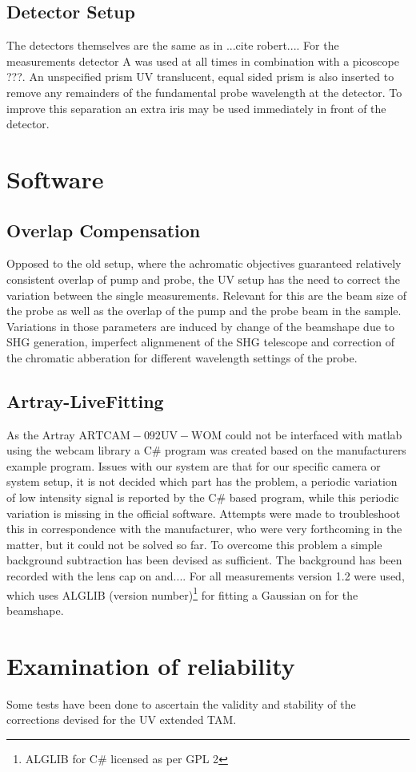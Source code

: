 \documentclass[10pt,a4paper]{article}
\begin{document}
\subsection{Detector Setup}
The detectors themselves are the same as in ...cite robert.... For the measurements detector A was used at all times in combination with a picoscope ???. An unspecified prism UV translucent, equal sided prism is also inserted to remove any remainders of the fundamental probe wavelength at the detector. To improve this separation an extra iris may be used immediately in front of the detector.
\section{Software}
\subsection{Overlap Compensation}
Opposed to the old setup, where the achromatic objectives guaranteed relatively consistent overlap of pump and probe, the UV setup has the need to correct the variation between the single measurements. \newline
Relevant for this are the beam size of the probe as well as the overlap of the pump and the probe beam in the sample. Variations in those parameters are induced by change of the beamshape due to SHG generation, imperfect alignmenent of the SHG telescope and correction of the chromatic abberation for different wavelength settings of the probe.\newline


\subsection{Artray-LiveFitting}
As the Artray $\mathrm{ARTCAM-092UV-WOM}$ could not be interfaced with matlab using the webcam library a C\# program was created based on the manufacturers example program.
Issues with our system are that for our specific camera or system setup, it is not decided which part has the problem, a periodic variation of low intensity signal is reported by the C\# based program, while this periodic variation is missing in the official software. Attempts were made to troubleshoot this in correspondence with the manufacturer, who were very forthcoming in the matter, but it could not be solved so far. To overcome this problem a simple background subtraction has been devised as sufficient. The background has been recorded with the lens cap on and....
\newline
For all measurements version 1.2 were used, which uses ALGLIB (version number)\footnote{ALGLIB for C\# licensed as per GPL 2} for fitting a Gaussian on for the beamshape.

\section{Examination of reliability}
Some tests have been done to ascertain the validity and stability of the corrections devised for the UV extended TAM.
\end{document}
